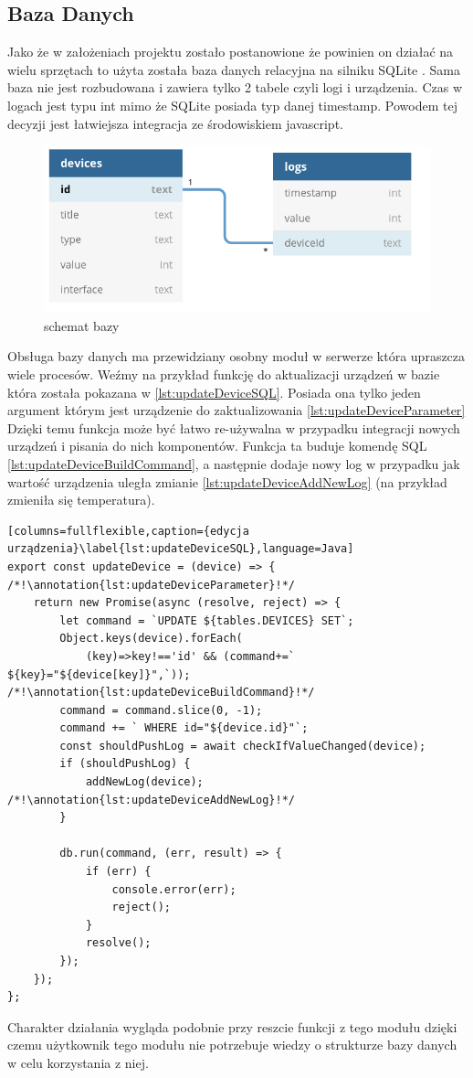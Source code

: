 \subsection{Baza Danych}
Jako że w założeniach projektu zostało postanowione że powinien on działać na wielu sprzętach to użyta została baza danych relacyjna na silniku SQLite \cite{sqlite}. Sama baza nie jest rozbudowana i zawiera tylko 2 tabele czyli logi i urządzenia. Czas w logach jest typu int mimo że SQLite posiada typ danej timestamp. Powodem tej decyzji jest łatwiejsza integracja ze środowiskiem javascript. \cite{sqlitejs}
\begin{figure}[h!]
  \includegraphics[width=\linewidth]{db.png}
  \caption{schemat bazy}
  \label{fig:db}
\end{figure}

Obsługa bazy danych ma przewidziany osobny moduł w serwerze która upraszcza wiele procesów. Weźmy na przykład funkcję do aktualizacji urządzeń w bazie która została pokazana w \ref{lst:updateDeviceSQL}. Posiada ona tylko jeden argument którym jest urządzenie do zaktualizowania \ref{lst:updateDeviceParameter} Dzięki temu funkcja może być łatwo re-używalna w przypadku integracji nowych urządzeń i pisania do nich komponentów. Funkcja ta buduje komendę SQL \ref{lst:updateDeviceBuildCommand}, a następnie dodaje nowy log w przypadku jak wartość urządzenia uległa zmianie \ref{lst:updateDeviceAddNewLog} (na przykład zmieniła się temperatura).
\newpage
\begin{lstlisting}[columns=fullflexible,caption={edycja urządzenia}\label{lst:updateDeviceSQL},language=Java]
export const updateDevice = (device) => { /*!\annotation{lst:updateDeviceParameter}!*/
	return new Promise(async (resolve, reject) => {
		let command = `UPDATE ${tables.DEVICES} SET`;
		Object.keys(device).forEach(
		    (key)=>key!=='id' && (command+=` ${key}="${device[key]}",`)); /*!\annotation{lst:updateDeviceBuildCommand}!*/
		command = command.slice(0, -1);
		command += ` WHERE id="${device.id}"`;
		const shouldPushLog = await checkIfValueChanged(device);
		if (shouldPushLog) {
			addNewLog(device); /*!\annotation{lst:updateDeviceAddNewLog}!*/
		}

		db.run(command, (err, result) => {
			if (err) {
				console.error(err);
				reject();
			}
			resolve();
		});
	});
};
\end{lstlisting}
Charakter działania wygląda podobnie przy reszcie funkcji z tego modułu dzięki czemu użytkownik tego modułu nie potrzebuje wiedzy o strukturze bazy danych w celu korzystania z niej. 

